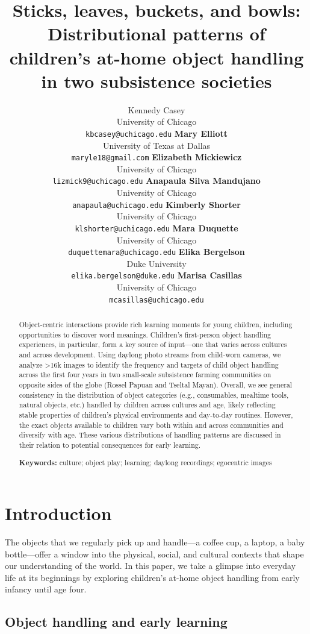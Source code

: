 \documentclass[10pt, letterpaper]{article}
\title{Sticks, leaves, buckets, and bowls: Distributional patterns of
children's at-home object handling in two subsistence societies}
\author{Kennedy Casey \\
        University of Chicago \\
        \texttt{\small{kbcasey@uchicago.edu}}
\And \textbf{Mary Elliott} \\
             University of Texas at Dallas \\
             \texttt{\small{maryle18@gmail.com}}
\And \textbf{Elizabeth Mickiewicz} \\
             University of Chicago \\
             \texttt{\small{lizmick9@uchicago.edu}}    
\And \textbf{Anapaula Silva Mandujano} \\
             University of Chicago \\
             \texttt{\small{anapaula@uchicago.edu}}   
\AND \textbf{Kimberly Shorter} \\
             University of Chicago \\
             \texttt{\small{klshorter@uchicago.edu}}
\And \textbf{Mara Duquette} \\
             University of Chicago \\
             \texttt{\small{duquettemara@uchicago.edu}}
\And \textbf{Elika Bergelson} \\
             Duke University \\
             \texttt{\small{elika.bergelson@duke.edu}}
\And \textbf{Marisa Casillas} \\
             University of Chicago \\
             \texttt{\small{mcasillas@uchicago.edu}}}
\begin{document}
\maketitle

\begin{abstract}
Object-centric interactions provide rich learning moments for young
children, including opportunities to discover word meanings. Children's
first-person object handling experiences, in particular, form a key
source of input---one that varies across cultures and across
development. Using daylong photo streams from child-worn cameras, we
analyze \textgreater16k images to identify the frequency and targets of
child object handling across the first four years in two small-scale
subsistence farming communities on opposite sides of the globe (Rossel
Papuan and Tseltal Mayan). Overall, we see general consistency in the
distribution of object categories (e.g., consumables, mealtime tools,
natural objects, etc.) handled by children across cultures and age,
likely reflecting stable properties of children's physical environments
and day-to-day routines. However, the exact objects available to
children vary both within and across communities and diversify with age.
These various distributions of handling patterns are discussed in their
relation to potential consequences for early learning.

\textbf{Keywords:}
culture; object play; learning; daylong recordings; egocentric images
\end{abstract}

\hypertarget{introduction}{%
\section{Introduction}\label{introduction}}

The objects that we regularly pick up and handle---a coffee cup, a
laptop, a baby bottle---offer a window into the physical, social, and
cultural contexts that shape our understanding of the world. In this
paper, we take a glimpse into everyday life at its beginnings by
exploring children's at-home object handling from early infancy until
age four.

\hypertarget{object-handling-and-early-learning}{%
\subsection{Object handling and early
learning}\label{object-handling-and-early-learning}}
\end{document}

